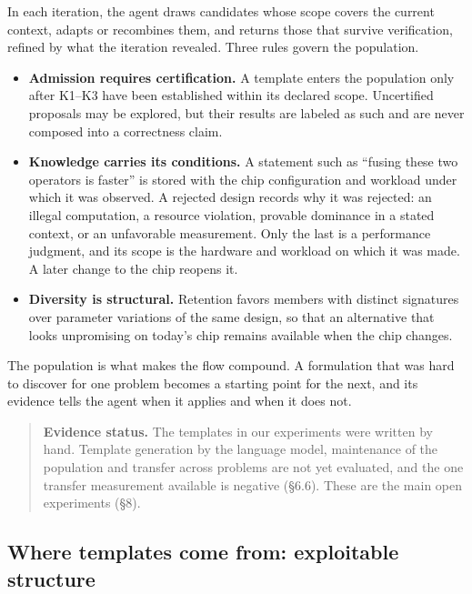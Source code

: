 \documentclass[11pt]{article}
\providecommand{\tightlist}{\setlength{\itemsep}{0pt}\setlength{\parskip}{0pt}}
\begin{document}
In each iteration, the agent draws candidates whose scope covers the current context, adapts or recombines them, and returns those that survive verification, refined by what the iteration revealed. Three rules govern the population.

\begin{itemize}
\tightlist
\item
  \textbf{Admission requires certification.} A template enters the population only after K1--K3 have been established within its declared scope. Uncertified proposals may be explored, but their results are labeled as such and are never composed into a correctness claim.
\item
  \textbf{Knowledge carries its conditions.} A statement such as ``fusing these two operators is faster'' is stored with the chip configuration and workload under which it was observed. A rejected design records why it was rejected: an illegal computation, a resource violation, provable dominance in a stated context, or an unfavorable measurement. Only the last is a performance judgment, and its scope is the hardware and workload on which it was made. A later change to the chip reopens it.
\item
  \textbf{Diversity is structural.} Retention favors members with distinct signatures over parameter variations of the same design, so that an alternative that looks unpromising on today's chip remains available when the chip changes.
\end{itemize}

The population is what makes the flow compound. A formulation that was hard to discover for one problem becomes a starting point for the next, and its evidence tells the agent when it applies and when it does not.

\begin{quote}
\textbf{Evidence status.} The templates in our experiments were written by hand. Template generation by the language model, maintenance of the population and transfer across problems are not yet evaluated, and the one transfer measurement available is negative (§6.6). These are the main open experiments (§8).
\end{quote}

\hypertarget{where-templates-come-from-exploitable-structure}{%
\subsection{Where templates come from: exploitable structure}\label{where-templates-come-from-exploitable-structure}}
\end{document}
